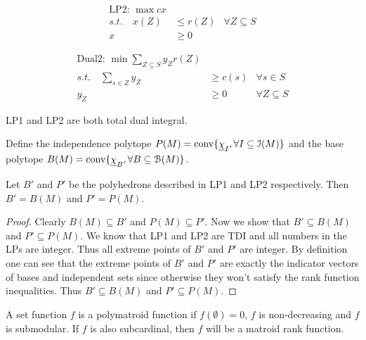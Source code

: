 \begin{minipage}{.45\textwidth}
\begin{align*}
    \text{LP2: } \max  cx\\
    s.t. \quad x(Z)&\leq r(Z) &\forall Z \subseteq S\\
                x&\geq 0
\end{align*}
\end{minipage}
\begin{minipage}{.45\textwidth}
    \begin{align*}
        \text{Dual2: } \min \sum_{Z\subseteq S} y_Z r(Z)\\
        s.t. \quad \sum_{s\in Z}y_Z&\geq c(s) & \forall s\in S\\
        y_Z&\geq 0 & \forall Z\subseteq S
    \end{align*}
\end{minipage}

LP1 and LP2 are both total dual integral.

Define the independence polytope $P(M)=\operatorname{conv}\{\underline{\chi}_I, \forall I\subseteq \mathcal I(M)\}$ and the base polytope $B(M)=\operatorname{conv}\{\underline{\chi}_B, \forall B\subseteq \mathcal B(M)\}$.

\begin{theorem}[5.5.8]
    Let $B'$ and $P'$ be the polyhedrons described in LP1 and LP2 respectively. Then $B'=B(M)$ and $P'=P(M)$.
\end{theorem}
\begin{proof}
    Clearly $B(M)\subseteq B'$ and $P(M)\subseteq P'$. Now we show that $B'\subseteq B(M)$ and $P'\subseteq P(M)$. We know that LP1 and LP2 are TDI and all numbers in the LPs are integer. Thus all extreme points of $B'$ and $P'$ are integer. By definition one can see that the extreme points of $B'$ and $P'$ are exactly the indicator vectors of bases and independent sets since otherwise they won't satisfy the rank function inequalities. Thus $B'\subseteq B(M)$ and $P'\subseteq P(M)$.
\end{proof}

A set function $f$ is a polymatroid function if $f(\emptyset)=0$, $f$ is non-decreasing and $f$ is submodular. If $f$ is also subcardinal, then $f$ will be a matroid rank function.

